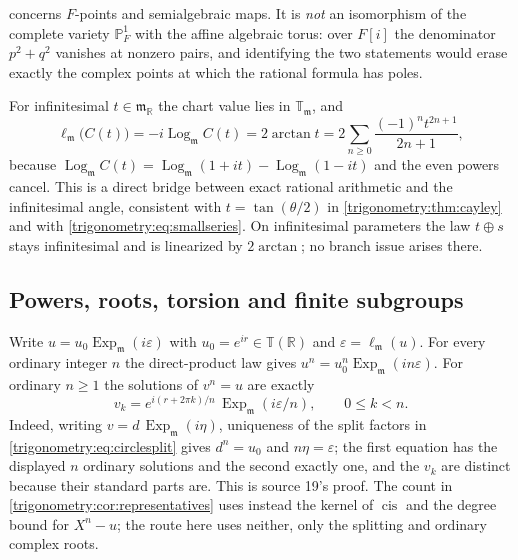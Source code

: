 \documentclass[11pt,letterpaper]{article}
\numberwithin{equation}{section}
\theoremstyle{definition}
\theoremstyle{remark}
\newcommand{\R}{\mathbb R}
\newcommand{\mm}{\mathfrak m}
\newcommand{\TT}{\mathbb T}
\newcommand{\PP}{\mathbb P}
\newcommand{\eps}{\varepsilon}
\newcommand{\cis}{\operatorname{cis}}
\newcommand{\Ex}{\operatorname{Exp}_{\mm}}
\newcommand{\Logm}{\operatorname{Log}_{\mm}}
\newcommand{\ellm}{\ell_{\mm}}
\newcommand{\Tm}{\TT_{\mm}}
\begin{document}
\begin{remark}
\label{trigonometry:rot:rem:projective}
 concerns $F$-points and semialgebraic maps. It is \emph{not} an
isomorphism of the complete variety $\PP^1_F$ with the affine algebraic torus: over $F[i]$ the
denominator $p^2+q^2$ vanishes at nonzero pairs, and identifying the two statements would erase
exactly the complex points at which the rational formula has poles.
\end{remark}

For infinitesimal $t\in\mm_{\R}$ the chart value lies in $\Tm$, and
\begin{equation}\label{trigonometry:rot:eq:arctanbridge}
 \ellm\bigl(C(t)\bigr)=-i\Logm C(t)=2\arctan t=2\sum_{n\ge0}\frac{(-1)^nt^{2n+1}}{2n+1},
\end{equation}
because $\Logm C(t)=\Logm(1+it)-\Logm(1-it)$ and the even powers cancel. This is a direct bridge
between exact rational arithmetic and the infinitesimal angle, consistent with $t=\tan(\theta/2)$
in \cref{trigonometry:thm:cayley} and with \cref{trigonometry:eq:smallseries}. On infinitesimal
parameters the law $t\oplus s$ stays infinitesimal and is linearized by $2\arctan$; no branch issue
arises there.

\subsection{Powers, roots, torsion and finite subgroups}\label{trigonometry:rot:sec:torsion}

\begin{remark}\label{trigonometry:rot:rem:rootsroute}
Write $u=u_0\Ex(i\eps)$ with $u_0=e^{ir}\in\TT(\R)$ and $\eps=\ellm(u)$. For every ordinary integer
$n$ the direct-product law gives $u^n=u_0^n\Ex(in\eps)$. For ordinary $n\ge1$ the solutions of
$v^n=u$ are exactly
\begin{equation}\label{trigonometry:rot:eq:roots}
 v_k=e^{i(r+2\pi k)/n}\,\Ex(i\eps/n),\qquad 0\le k<n .
\end{equation}
Indeed, writing $v=d\,\Ex(i\eta)$, uniqueness of the split factors in
\cref{trigonometry:eq:circlesplit} gives $d^n=u_0$ and $n\eta=\eps$; the first equation has the
displayed $n$ ordinary solutions and the second exactly one, and the $v_k$ are distinct because
their standard parts are. This is source 19's proof. The count in
\cref{trigonometry:cor:representatives} uses instead the kernel of $\cis$ and the degree bound for
$X^n-u$; the route here uses neither, only the splitting and ordinary complex roots.
\end{remark}
\end{document}

